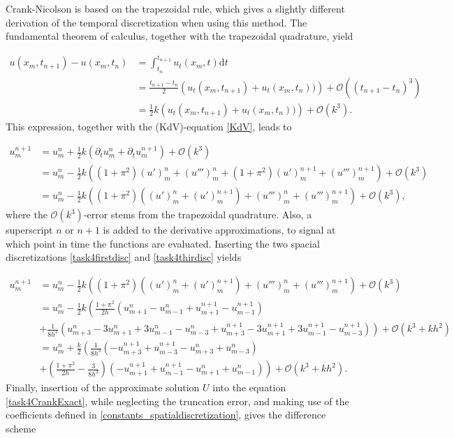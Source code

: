Crank-Nicolson is based on the trapezoidal rule, which gives a slightly different derivation of the temporal discretization when using this method. The fundamental theorem of calculus, together with the trapezoidal quadrature, yield

\begin{equation*}
\begin{split}
    u(x_m, t_{n+1}) - u(x_m, t_n) & = \int_{t_n}^{t_{n+1}} u_t(x_m, t)\mathrm{d}t \\
    &= \frac{t_{n+1}-t_n}{2} \left(u_t(x_m,t_{n+1}) + u_t(x_m,t_n))\right) + \mathcal{O}((t_{n+1}-t_n)^3) \\
    &= \frac{1}{2}k \left(u_t(x_m,t_{n+1})+u_t(x_m,t_n))\right) + \mathcal{O}(k^3).
\end{split}
\end{equation*}
This expression, together with the (KdV)-equation \eqref{KdV}, leads to 

\begin{equation}
\begin{split}
    u_m^{n+1} &= u_m^n + \frac12k(\partial_tu_m^n + \partial_tu_m^{n+1}) + \mathcal{O}(k^3) \\
    &= u_m^n - \frac12k((1+\pi^2)(u')_m^{n} + (u''')_m^{n}+(1+\pi^2)(u')_m^{n+1} + (u''')_m^{n+1}) + \mathcal{O}(k^3) \\
    &= u_m^n - \frac12k((1+\pi^2)((u')_m^{n} + (u')_m^{n+1}) + (u''')_m^{n} + (u''')_m^{n+1}) + \mathcal{O}(k^3), 
\end{split}
\end{equation}
where the $\mathcal{O}(k^3)$-error stems from the trapezoidal quadrature. Also, a superscript $n$ or $n+1$ is added to the derivative approximations, to signal at which point in time the functions are evaluated. Inserting the two spacial discretizations \eqref{task4firstdisc} and \eqref{task4thirdisc} yields

\begin{equation}
\begin{split}
\label{task4CrankExact}
    u_m^{n+1} &= u_m^n - \frac12k((1+\pi^2)((u')_m^{n} + (u')_m^{n+1}) + (u''')_m^{n} + (u''')_m^{n+1}) + \mathcal{O}(k^3) \\
    &= u_m^n - \frac12k\left(\frac{1+\pi^2}{2h}(u_{m+1}^n - u_{m-1}^n + u_{m+1}^{n+1} - u_{m-1}^{n+1}) \right.\\ &\left.+ \frac{1}{8h^3}(u_{m+3}^n - 3u_{m+1}^n + 3u_{m-1}^n - u_{m-3}^n + u_{m+3}^{n+1} - 3u_{m+1}^{n+1} + 3u_{m-1}^{n+1} - u_{m-3}^{n+1})\right) + \mathcal{O}(k^3 + k h^2)\\
    &= u_m^n + \frac{k}{2}\left( \frac{1}{8h^3}(-u_{m+3}^{n+1} + u_{m-3}^{n+1}-u_{m+3}^n + u_{m-3}^n) \right.\\ &\left.+ \left(\frac{1+\pi^2}{2h}-\frac{3}{8h^3}\right) (-u_{m+1}^{n+1} + u_{m-1}^{n+1}-u_{m+1}^n+u_{m-1}^n) \right) + \mathcal{O}(k^3 + k h^2).
\end{split}
\end{equation}
Finally, insertion of the approximate solution $U$ into the equation \eqref{task4CrankExact}, while neglecting the truncation error, and making use of the coefficients defined in \eqref{constants_spatialdiscretization}, gives the difference scheme 

